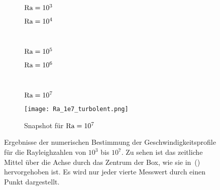 \begin{figure}[!h]
        \centering
        \begin{subfigure}{0.5\textwidth}
        
        \caption{$\textnormal{Ra} = \num{e3}$}
        \label{fig:vprof_Ra_1e3}
\end{subfigure}\hfill
        \begin{subfigure}{0.5\textwidth}
        
        \caption{$\textnormal{Ra} = \num{e4}$}
        \label{fig:vprof_Ra_1e4}
\end{subfigure} \\
        \begin{subfigure}{0.5\textwidth}
        
        \caption{$\textnormal{Ra} = \num{e5}$}
        \label{fig:vprof_Ra_1e5}
\end{subfigure}\hfill
        \begin{subfigure}{0.5\textwidth}
        
        \caption{$\textnormal{Ra} = \num{e6}$}
        \label{fig:vprof_Ra_1e6}
\end{subfigure} \\
        \begin{subfigure}{0.5\textwidth}
        
        \caption{$\textnormal{Ra} = \num{e7}$}
        \label{fig:vprof_Ra_1e7}
\end{subfigure}\hfill
        \begin{subfigure}{0.5\textwidth}
                \texttt{[image: Ra\_1e7\_turbolent.png]}
                \caption{Snapshot für $\textnormal{Ra} = \num{e7}$}
                \label{fig:SimSnapshot}
         \end{subfigure}
        \caption{Ergebnisse der numerischen Bestimmung der Geschwindigkeitsprofile für die Rayleighzahlen von $10^{3}$ bis $10^7$. Zu sehen ist das zeitliche Mittel über die Achse durch das Zentrum der Box, wie sie in~() hervorgehoben ist.
Es wird nur jeder vierte Messwert durch einen Punkt dargestellt. 
        }\label{fig:SimVprof}
\end{figure}
